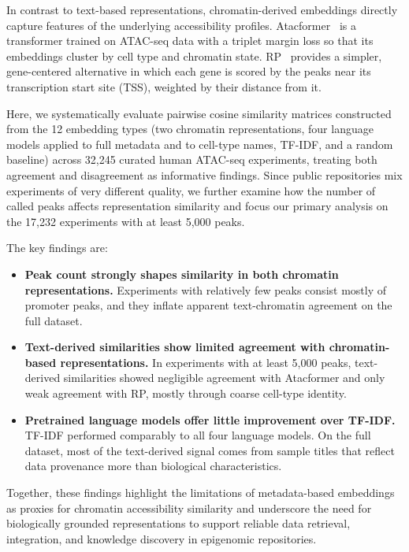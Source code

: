 \documentclass[12pt]{article}
\begin{document}
In contrast to text-based representations, chromatin-derived embeddings
directly capture features of the underlying accessibility profiles.
Atacformer~\cite{atacformer} is a transformer trained on ATAC-seq data with a
triplet margin loss so that its embeddings cluster by cell type and chromatin
state. RP~\cite{lisa2} provides a simpler, gene-centered alternative in which
each gene is scored by the peaks near its transcription start site (TSS),
weighted by their distance from it.

Here, we systematically evaluate pairwise cosine similarity matrices
constructed from the 12 embedding types (two chromatin representations, four
language models applied to full metadata and to cell-type names, TF-IDF, and a
random baseline) across 32,245 curated human ATAC-seq experiments, treating
both agreement and disagreement as informative findings. Since public
repositories mix experiments of very different quality, we further examine
how the number of called peaks affects representation similarity and focus
our primary analysis on the 17,232 experiments with at least 5,000 peaks.

The key findings are:
\begin{itemize}
  \setlength{\itemsep}{2pt}
  \item \textbf{Peak count strongly shapes similarity in both chromatin
        representations.} Experiments with relatively few peaks consist mostly
        of promoter peaks, and they inflate apparent text-chromatin agreement
        on the full dataset.
  \item \textbf{Text-derived similarities show limited agreement with
        chromatin-based representations.} In experiments with at least 5,000
        peaks, text-derived similarities showed negligible agreement with
        Atacformer and only weak agreement with RP, mostly through coarse
        cell-type identity.
  \item \textbf{Pretrained language models offer little improvement over
        TF-IDF.} TF-IDF performed comparably to all four language models. On
        the full dataset, most of the text-derived signal comes from sample
        titles that reflect data provenance more than biological
        characteristics.
\end{itemize}

\noindent Together, these findings highlight the limitations of metadata-based
embeddings as proxies for chromatin accessibility similarity and underscore the
need for biologically grounded representations to support reliable data
retrieval, integration, and knowledge discovery in epigenomic repositories.
\end{document}
